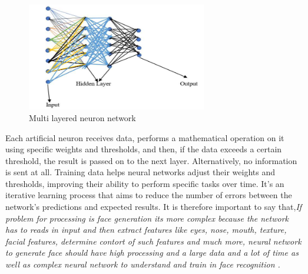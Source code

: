 \begin{figure}[h]
  \centering
  \includegraphics[width=0.7\textwidth]{images/deepNeural.PNG} 
  \caption{Multi layered neuron network \cite{negiDeepFakeUnderstanding2021}}
  \label{fig:1}
\end{figure}
Each artificial neuron receives data, performs a mathematical operation on it using specific weights and thresholds, and then, if the data exceeds a certain threshold, the result is passed on to the next layer. Alternatively, no information is sent at all. Training data helps neural networks adjust their weights and thresholds, improving their ability to perform specific tasks over time. It's an iterative learning process that aims to reduce the number of errors between the network's predictions and expected results.
It is therefore important to say that,\emph{If problem for processing is face generation its more complex because the network has to reads in input and then extract features like eyes, nose, mouth, texture, facial features, determine contort of such features and much more, neural network to generate face should have high processing and a large data and a lot of time as well as complex neural network to understand and train in face recognition \cite{negiDeepFakeUnderstanding2021}.}
